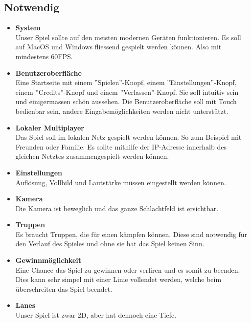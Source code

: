 \subsection*{Notwendig}
\begin{itemize}
    \item \textbf{System} \\
        Unser Spiel sollte auf den meisten modernen Geräten funktionieren. Es soll auf MacOS und
        Windows fliessend gespielt werden können. Also mit mindestens 60FPS.
    \item \textbf{Benutzeroberfläche} \\
        Eine Startseite mit einem ''Spielen''-Knopf, einem ''Einstellungen''-Knopf, einem
        ''Credits''-Knopf und einem ''Verlassen''-Knopf. Sie soll intuitiv sein und einigermassen
        schön aussehen. Die Benutzeroberfläche soll mit Touch bedienbar sein, andere Eingabemöglichkeiten
        werden nicht unterstützt.
    \item \textbf{Lokaler Multiplayer} \\
        Das Spiel soll im lokalen Netz gespielt werden können. So zum Beispiel mit Freunden oder Familie.
        Es sollte mithilfe der IP-Adresse innerhalb des gleichen Netztes zusammengespielt werden können.
    \item \textbf{Einstellungen} \\
        Auflösung, Vollbild und Lautstärke müssen eingestellt werden können.
    \item \textbf{Kamera} \\
        Die Kamera ist beweglich und das ganze Schlachtfeld ist ersichtbar.
    \item \textbf{Truppen} \\
        Es braucht Truppen, die für einen kämpfen können. Diese sind notwendig für den Verlauf des Spieles
        und ohne sie hat das Spiel keinen Sinn.
    \item \textbf{Gewinnmöglichkeit} \\
        Eine Chance das Spiel zu gewinnen oder verliren und es somit zu beenden. Dies kann sehr simpel
        mit einer Linie vollendet werden, welche beim überschreiten das Spiel beendet.
    \item \textbf{Lanes} \\
        Unser Spiel ist zwar 2D, aber hat dennoch eine Tiefe.
\end{itemize}

